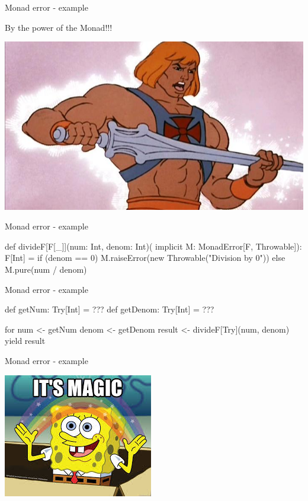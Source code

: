 \documentclass[13pt]{beamer}
\begin{document}
\begin{frame}{Monad error - example}

  By the power of the Monad!!!

  \begin{center}
    \includegraphics[scale=0.33]{figures/he-man.jpg}
  \end{center}

\end{frame}

\begin{frame}[fragile]{Monad error - example}

  \begin{scalaCode}
    def divideF[F[_]](num: Int, denom: Int)(
        implicit M: MonadError[F, Throwable]): F[Int] = {
      if (denom == 0) M.raiseError(new Throwable("Division by 0"))
      else M.pure(num / denom)
    }
  \end{scalaCode}

\end{frame}

\begin{frame}[fragile]{Monad error - example}

  \begin{scalaCode}
    def getNum: Try[Int] = ???
    def getDenom: Try[Int] = ???

    for {
      num <- getNum
      denom <- getDenom
      result <- divideF[Try](num, denom)
    } yield result
  \end{scalaCode}

\end{frame}

\begin{frame}{Monad error - example}

  \begin{center}
    \includegraphics[scale=0.66]{figures/magic.jpeg}
  \end{center}

\end{frame}
\end{document}
